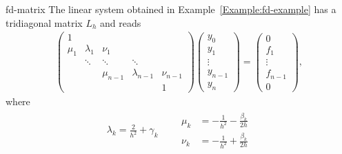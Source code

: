 \begin{Example}{fd-matrix}
  The linear system obtained in Example~\ref{Example:fd-example} has a
  tridiagonal matrix $L_h$ and reads
  \begin{gather}
    \label{eq:fd-matrix:1}
    \begin{pmatrix}
      1 \\
      \mu_1 & \lambda_1 & \nu_1 \\
      & \ddots & \ddots & \ddots \\
      &&\mu_{n-1} & \lambda_{n-1} & \nu_{n-1} \\
      &&&&1
    \end{pmatrix}
    \begin{pmatrix}
      y_0 \\y_1\\\vdots\\y_{n-1}\\y_n
    \end{pmatrix}
    =
    \begin{pmatrix}
      0 \\ f_1 \\ \vdots \\f_{n-1} \\ 0
    \end{pmatrix},
  \end{gather}
  where
  \begin{gather*}
    \lambda_k = \frac2{h^2} + \gamma_k
    \qquad
    \begin{aligned}
    \mu_k &= -\frac1{h^2} - \frac{\beta_k}{2h} \\
    \nu_k &= -\frac1{h^2} + \frac{\beta_k}{2h}      
    \end{aligned}
  \end{gather*}
\end{Example}

